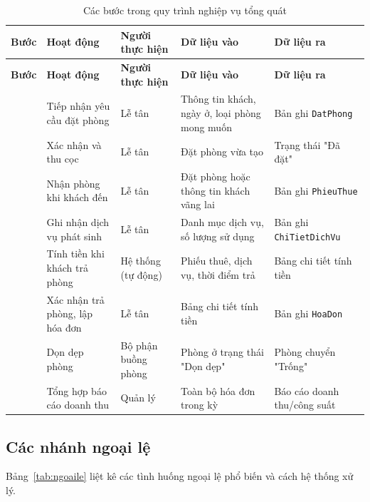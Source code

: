 \documentclass[14pt]{report}
\begin{document}
\small
\setlength{\tabcolsep}{4pt}
\renewcommand{\arraystretch}{1.18}
\begin{longtable}{|>{\centering\arraybackslash}m{0.8cm}|>{\raggedright\arraybackslash}m{3.0cm}|>{\raggedright\arraybackslash}m{2.9cm}|>{\raggedright\arraybackslash}m{3.1cm}|>{\raggedright\arraybackslash}m{3.0cm}|}
\caption{Các bước trong quy trình nghiệp vụ tổng quát}\label{tab:quytrinh}\\
\hline
\textbf{Bước} & \textbf{Hoạt động} & \textbf{Người thực hiện} & \textbf{Dữ liệu vào} & \textbf{Dữ liệu ra}\\\hline
\endfirsthead
\hline \textbf{Bước} & \textbf{Hoạt động} & \textbf{Người thực hiện} & \textbf{Dữ liệu vào} & \textbf{Dữ liệu ra}\\\hline
\endhead
1 & Tiếp nhận yêu cầu đặt phòng & Lễ tân & Thông tin khách, ngày ở, loại phòng mong muốn & Bản ghi \texttt{DatPhong} \\\hline
2 & Xác nhận và thu cọc & Lễ tân & Đặt phòng vừa tạo & Trạng thái "Đã đặt" \\\hline
3 & Nhận phòng khi khách đến & Lễ tân & Đặt phòng hoặc thông tin khách vãng lai & Bản ghi \texttt{PhieuThue} \\\hline
4 & Ghi nhận dịch vụ phát sinh & Lễ tân & Danh mục dịch vụ, số lượng sử dụng & Bản ghi \texttt{ChiTietDichVu} \\\hline
5 & Tính tiền khi khách trả phòng & Hệ thống (tự động) & Phiếu thuê, dịch vụ, thời điểm trả & Bảng chi tiết tính tiền \\\hline
6 & Xác nhận trả phòng, lập hóa đơn & Lễ tân & Bảng chi tiết tính tiền & Bản ghi \texttt{HoaDon} \\\hline
7 & Dọn dẹp phòng & Bộ phận buồng phòng & Phòng ở trạng thái "Dọn dẹp" & Phòng chuyển "Trống" \\\hline
8 & Tổng hợp báo cáo doanh thu & Quản lý & Toàn bộ hóa đơn trong kỳ & Báo cáo doanh thu/công suất \\\hline
\end{longtable}
\normalsize

\subsection{Các nhánh ngoại lệ}

Bảng~\ref{tab:ngoaile} liệt kê các tình huống ngoại lệ phổ biến và cách hệ thống xử lý.
\end{document}
